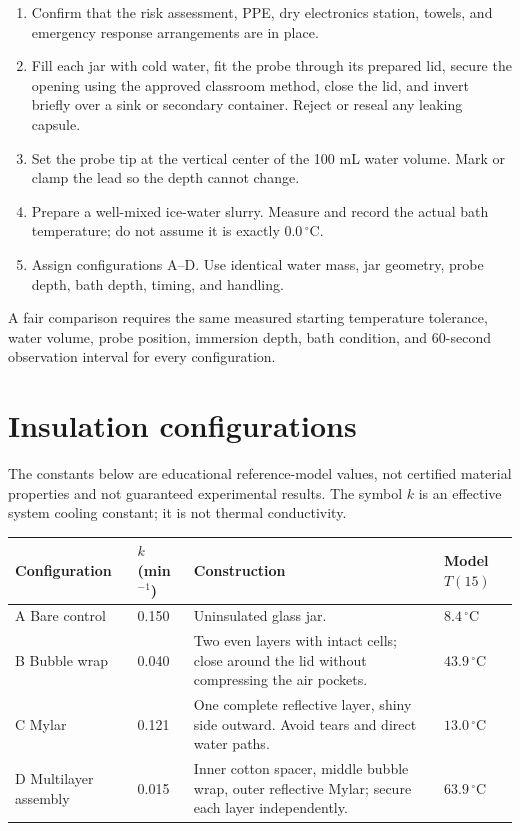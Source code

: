 \documentclass[11pt,a4paper]{article}
\newcommand{\control}[1]{\par\noindent{\color{green}\textbf{CONTROL - }}#1\par}
\begin{document}
\begin{enumerate}
  \item Confirm that the risk assessment, PPE, dry electronics station, towels, and emergency response arrangements are in place.
  \item Fill each jar with cold water, fit the probe through its prepared lid, secure the opening using the approved classroom method, close the lid, and invert briefly over a sink or secondary container. Reject or reseal any leaking capsule.
  \item Set the probe tip at the vertical center of the 100 mL water volume. Mark or clamp the lead so the depth cannot change.
  \item Prepare a well-mixed ice-water slurry. Measure and record the actual bath temperature; do not assume it is exactly $0.0\,^{\circ}\mathrm{C}$.
  \item Assign configurations A--D. Use identical water mass, jar geometry, probe depth, bath depth, timing, and handling.
\end{enumerate}

\control{A fair comparison requires the same measured starting temperature tolerance, water volume, probe position, immersion depth, bath condition, and 60-second observation interval for every configuration.}

\section{Insulation configurations}

The constants below are educational reference-model values, not certified material properties and not guaranteed experimental results. The symbol $k$ is an effective system cooling constant; it is not thermal conductivity.

\begin{tabularx}{\textwidth}{p{}C{22mm}Yp{0.25\textwidth}}
\toprule
\textbf{Configuration} & \textbf{$k$ (min$^{-1}$)} & \textbf{Construction} & \textbf{Model $T(15)$} \\
\midrule
A Bare control & 0.150 & Uninsulated glass jar. & $8.4\,^{\circ}\mathrm{C}$ \\
B Bubble wrap & 0.040 & Two even layers with intact cells; close around the lid without compressing the air pockets. & $43.9\,^{\circ}\mathrm{C}$ \\
C Mylar & 0.121 & One complete reflective layer, shiny side outward. Avoid tears and direct water paths. & $13.0\,^{\circ}\mathrm{C}$ \\
D Multilayer assembly & 0.015 & Inner cotton spacer, middle bubble wrap, outer reflective Mylar; secure each layer independently. & $63.9\,^{\circ}\mathrm{C}$ \\
\bottomrule
\end{tabularx}
\end{document}
